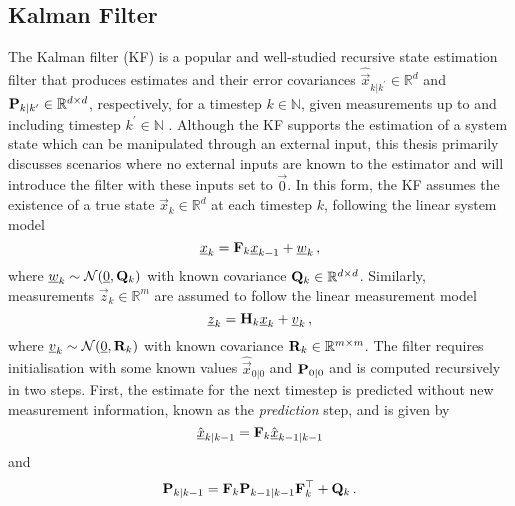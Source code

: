 \subsection{Kalman Filter}\label{subsec:prelims:kf}
The Kalman filter (KF) \cite{andersonOptimalFiltering1979,kalmanNewApproachLinear1960} is a popular and well-studied recursive state estimation filter that produces estimates and their error covariances $\hat{\vec{x}}_{k|k^\prime} \in \mathbb{R}^d$ and ${{\mathbf{P}}}_{k|k^\prime} \in \mathbb{R}^{d \times d}$, respectively, for a timestep $k \in \mathbb{N}$, given measurements up to and including timestep $k^\prime \in \mathbb{N}$ \cite{simonOptimalStateEstimation2006,haugBayesianEstimationTracking2012,crassidisOptimalEstimationDynamic2004,chuiKalmanFilteringRealTime2013}. Although the KF supports the estimation of a system state which can be manipulated through an external input, this thesis primarily discusses scenarios where no external inputs are known to the estimator and will introduce the filter with these inputs set to $\vec{0}$. In this form, the KF assumes the existence of a true state $\vec{x}_k \in \mathbb{R}^d$ at each timestep $k$, following the linear system model
\begin{equation}\label{eq:prelims:lin_gauss_system_model}
    {\underline{x}}_k = {{\mathbf{F}}}_k {\underline{x}}_{k-1} + {\underline{w}}_k\,,
\end{equation}
where ${\underline{w}}_k \sim \mathcal{N}({\underline{0}}, {{\mathbf{Q}}}_k)$ with known covariance ${{\mathbf{Q}}}_k \in \mathbb{R}^{d \times d}$. Similarly, measurements $\vec{z}_k \in \mathbb{R}^m$ are assumed to follow the linear measurement model
\begin{equation}\label{eq:prelims:lin_gauss_measurement_model}
    {\underline{z}}_k = {{\mathbf{H}}}_k {\underline{x}}_k + {\underline{v}}_k\,,
\end{equation}
where ${\underline{v}}_k \sim \mathcal{N}({\underline{0}}, {{\mathbf{R}}}_k)$ with known covariance ${{\mathbf{R}}}_k \in \mathbb{R}^{m \times m}$. The filter requires initialisation with some known values $\hat{\vec{x}}_{0|0}$ and ${{\mathbf{P}}}_{0|0}$ and is computed recursively in two steps. First, the estimate for the next timestep is predicted without new measurement information, known as the \textit{prediction} step, and is given by
\begin{equation}\label{eq:prelims:kf_est_predict}
    \hat{{\underline{x}}}_{k|k-1} = {{\mathbf{F}}}_k \hat{{\underline{x}}}_{k-1|k-1}
\end{equation}
and
\begin{equation}\label{eq:prelims:kf_cov_predict}
    {\ensuremath{{\mathbf{P}}}}_{k|k-1} = {{\mathbf{F}}}_k {{\mathbf{P}}}_{k-1|k-1} {{\mathbf{F}}}_k^\top + {{\mathbf{Q}}}_k\,.
\end{equation}
